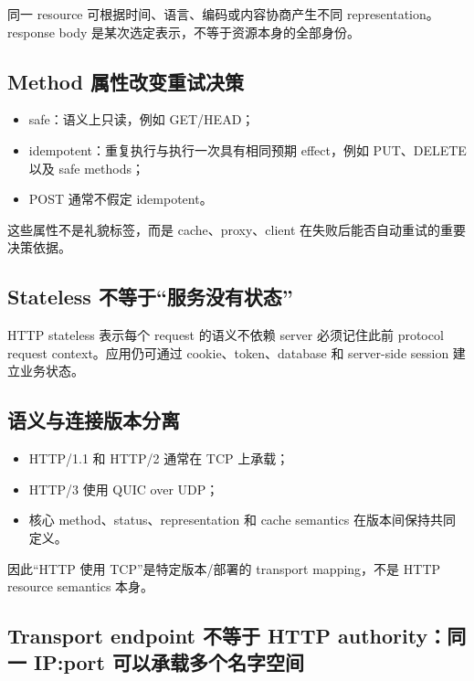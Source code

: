 \documentclass[UTF8,fontset=none,11pt,a4paper]{ctexart}
\providecommand{\tightlist}{\setlength{\itemsep}{0pt}\setlength{\parskip}{0pt}}
\begin{document}
同一 resource 可根据时间、语言、编码或内容协商产生不同
representation。response body 是某次选定表示，不等于资源本身的全部身份。

\subsection{Method
属性改变重试决策}\label{42-method-ux5c5eux6027ux6539ux53d8ux91cdux8bd5ux51b3ux7b56}

\begin{itemize}
\tightlist
\item
  safe：语义上只读，例如 GET/HEAD；
\item
  idempotent：重复执行与执行一次具有相同预期 effect，例如 PUT、DELETE
  以及 safe methods；
\item
  POST 通常不假定 idempotent。
\end{itemize}

这些属性不是礼貌标签，而是 cache、proxy、client
在失败后能否自动重试的重要决策依据。

\subsection{Stateless
不等于``服务没有状态''}\label{43-stateless-ux4e0dux7b49ux4e8eux670dux52a1ux6ca1ux6709ux72b6ux6001}

HTTP stateless 表示每个 request 的语义不依赖 server 必须记住此前
protocol request context。应用仍可通过 cookie、token、database 和
server-side session 建立业务状态。

\subsection{语义与连接版本分离}\label{44-ux8bedux4e49ux4e0eux8fdeux63a5ux7248ux672cux5206ux79bb}

\begin{itemize}
\tightlist
\item
  HTTP/1.1 和 HTTP/2 通常在 TCP 上承载；
\item
  HTTP/3 使用 QUIC over UDP；
\item
  核心 method、status、representation 和 cache semantics
  在版本间保持共同定义。
\end{itemize}

因此``HTTP 使用 TCP''是特定版本/部署的 transport mapping，不是 HTTP
resource semantics 本身。

\subsection{Transport endpoint 不等于 HTTP authority：同一 IP:port 可以承载多个名字空间}
\end{document}
